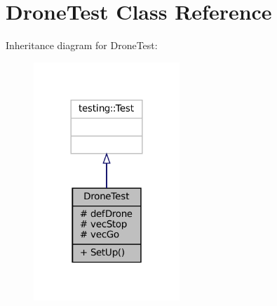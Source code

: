 \hypertarget{classDroneTest}{}\section{Drone\+Test Class Reference}
\label{classDroneTest}


Inheritance diagram for Drone\+Test\+:
\nopagebreak
\begin{figure}[H]
\begin{center}
\leavevmode
\includegraphics[width=156pt]{classDroneTest__inherit__graph}
\end{center}
\end{figure}


